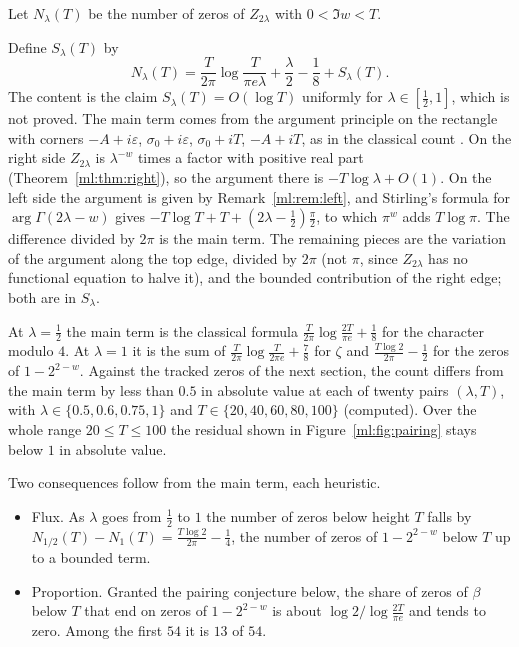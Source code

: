 Let $N_\lambda(T)$ be the number of zeros of $Z_{2\lambda}$ with $0<\Im w<T$.
\begin{remark}\label{ml:rem:count}
Define $S_\lambda(T)$ by
\[
N_\lambda(T)=\frac{T}{2\pi}\log\frac{T}{\pi e\lambda}+\frac\lambda2-\frac18+S_\lambda(T).
\]
The content is the claim $S_\lambda(T)=O(\log T)$ uniformly for $\lambda\in[\frac12,1]$, which is not proved. The main term comes from the argument principle on the rectangle with corners $-A+i\varepsilon$, $\sigma_0+i\varepsilon$, $\sigma_0+iT$, $-A+iT$, as in the classical count \cite[Chapters 15 and 16]{Davenport}. On the right side $Z_{2\lambda}$ is $\lambda^{-w}$ times a factor with positive real part (Theorem~\ref{ml:thm:right}), so the argument there is $-T\log\lambda+O(1)$. On the left side the argument is given by Remark~\ref{ml:rem:left}, and Stirling's formula for $\arg\Gamma(2\lambda-w)$ gives $-T\log T+T+(2\lambda-\frac12)\frac\pi2$, to which $\pi^w$ adds $T\log\pi$. The difference divided by $2\pi$ is the main term. The remaining pieces are the variation of the argument along the top edge, divided by $2\pi$ (not $\pi$, since $Z_{2\lambda}$ has no functional equation to halve it), and the bounded contribution of the right edge; both are in $S_\lambda$.
\end{remark}
At $\lambda=\frac12$ the main term is the classical formula $\frac{T}{2\pi}\log\frac{2T}{\pi e}+\frac18$ for the character modulo $4$. At $\lambda=1$ it is the sum of $\frac{T}{2\pi}\log\frac{T}{2\pi e}+\frac78$ for $\zeta$ and $\frac{T\log2}{2\pi}-\frac12$ for the zeros of $1-2^{2-w}$. Against the tracked zeros of the next section, the count differs from the main term by less than $0.5$ in absolute value at each of twenty pairs $(\lambda,T)$, with $\lambda\in\{0.5,0.6,0.75,1\}$ and $T\in\{20,40,60,80,100\}$ (computed). Over the whole range $20\le T\le100$ the residual shown in Figure~\ref{ml:fig:pairing} stays below $1$ in absolute value.%

Two consequences follow from the main term, each heuristic.
\begin{itemize}
\item Flux. As $\lambda$ goes from $\frac12$ to $1$ the number of zeros below height $T$ falls by $N_{1/2}(T)-N_1(T)=\frac{T\log2}{2\pi}-\frac14$, the number of zeros of $1-2^{2-w}$ below $T$ up to a bounded term.
\item Proportion. Granted the pairing conjecture below, the share of zeros of $\beta$ below $T$ that end on zeros of $1-2^{2-w}$ is about $\log2/\log\frac{2T}{\pi e}$ and tends to zero. Among the first $54$ it is $13$ of $54$.
\end{itemize}

